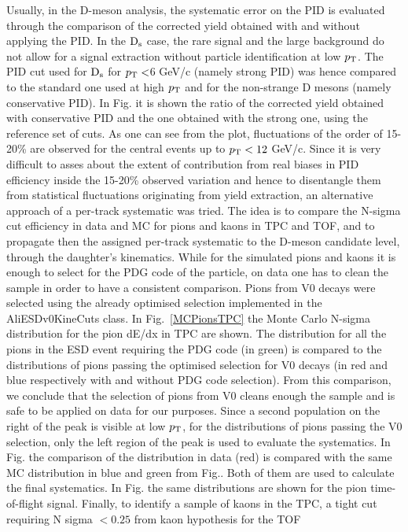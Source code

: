 Usually, in the D-meson analysis, the systematic error on the PID is evaluated through the comparison of the
corrected yield obtained with and without applying the PID. In the ${\rm D_s}$ case, the rare signal and the large
background do not allow for a signal extraction without particle identification at low $p_{\rm T}$. The PID cut used
for ${\rm D_s}$ for $p_{\rm T} < $6 GeV/c (namely strong PID) was hence compared to the standard one used at high $p_{\rm T}$ and for the non-strange D
mesons (namely conservative PID). In Fig. it is shown the ratio of the corrected yield obtained with
conservative PID and the one obtained with the strong one, using the reference set of cuts.
As one can see from the plot, fluctuations of the order of 15-20\% are observed for the central events up to $p_{\rm T} < 12$ GeV/c.
Since it is very difficult to asses about the extent of contribution from real biases in PID efficiency inside the 15-20\% observed variation 
and hence to disentangle them from statistical fluctuations originating from yield extraction, an alternative approach of a per-track systematic was tried.
The idea is to compare the N-sigma cut efficiency in data and MC for pions and kaons in TPC and TOF, and to propagate then the
assigned per-track systematic to the D-meson candidate level, through the daughter's kinematics.
While for the simulated pions and kaons it is enough to select for the PDG code of the particle, on data one has to clean 
the sample in order to have a consistent comparison. Pions from V0 decays were selected using the already optimised selection
implemented in the AliESDv0KineCuts class. In Fig.~\ref{MCPionsTPC} the Monte Carlo N-sigma distribution for the pion dE/dx in TPC are shown.
The distribution for all the pions in the ESD event requiring the PDG code (in green) is compared to the
distributions of pions passing the optimised selection for V0 decays (in red and blue respectively with and without PDG code selection).
From this comparison, we conclude that the selection of pions from V0 cleans enough the sample and is safe to be applied 
on data for our purposes. Since a second population on the right of the peak is visible at low $p_{\rm T}$, for the distributions
of pions passing the V0 selection, only the left region of the peak is used to evaluate the systematics.
In Fig. the comparison of the distribution in data (red) is compared
with the same MC distribution in blue and green from Fig.. Both of them are used to calculate
the final systematics. In Fig. the same distributions are shown for the pion time-of-flight signal.
Finally, to identify a sample of kaons in the TPC, a tight cut requiring N sigma $< 0.25$ from kaon hypothesis for the TOF

